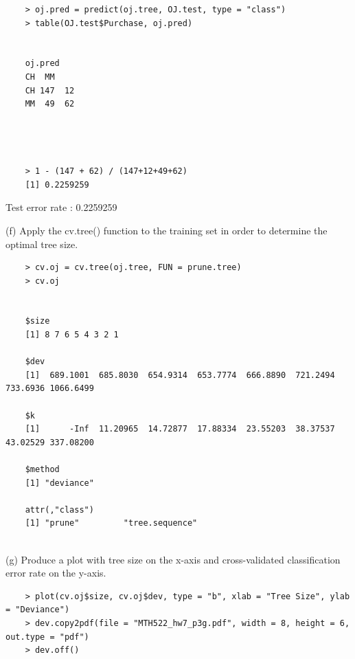 \documentclass{article}
\begin{document}
\begin{program}
	\begin{verbatim}
	> oj.pred = predict(oj.tree, OJ.test, type = "class")
	> table(OJ.test$Purchase, oj.pred)
	
	
	oj.pred
	CH  MM
	CH 147  12
	MM  49  62
	
	
	
	
	> 1 - (147 + 62) / (147+12+49+62)
	[1] 0.2259259
	\end{verbatim}
\end{program}

Test error rate : 0.2259259


(f) Apply the cv.tree() function to the training set in order to determine the optimal tree size.\\

\begin{program}
	\begin{verbatim}
	> cv.oj = cv.tree(oj.tree, FUN = prune.tree)
	> cv.oj


	$size
	[1] 8 7 6 5 4 3 2 1
	
	$dev
	[1]  689.1001  685.8030  654.9314  653.7774  666.8890  721.2494  733.6936 1066.6499
	
	$k
	[1]      -Inf  11.20965  14.72877  17.88334  23.55203  38.37537  43.02529 337.08200
	
	$method
	[1] "deviance"
	
	attr(,"class")
	[1] "prune"         "tree.sequence"
	
	\end{verbatim}
\end{program}


\newpage


(g) Produce a plot with tree size on the x-axis and cross-validated classification error rate on the y-axis.\\

\begin{program}
	\begin{verbatim}
	> plot(cv.oj$size, cv.oj$dev, type = "b", xlab = "Tree Size", ylab = "Deviance")
	> dev.copy2pdf(file = "MTH522_hw7_p3g.pdf", width = 8, height = 6, out.type = "pdf")
	> dev.off()
	\end{verbatim}
\end{program}
\end{document}
